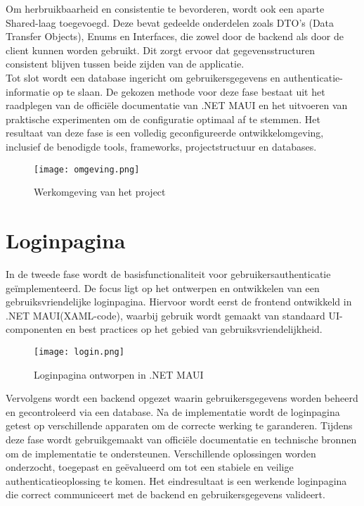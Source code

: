 Om herbruikbaarheid en consistentie te bevorderen, wordt ook een aparte Shared-laag toegevoegd. Deze bevat gedeelde onderdelen zoals DTO's (Data Transfer Objects), Enums en Interfaces, die zowel door de backend als door de client kunnen worden gebruikt. Dit zorgt ervoor dat gegevensstructuren consistent blijven tussen beide zijden van de applicatie. \\

Tot slot wordt een database ingericht om gebruikersgegevens en authenticatie-informatie op te slaan. De gekozen methode voor deze fase bestaat uit het raadplegen van de officiële documentatie van .NET MAUI en het uitvoeren van praktische experimenten om de configuratie optimaal af te stemmen. Het resultaat van deze fase is een volledig geconfigureerde ontwikkelomgeving, inclusief de benodigde tools, frameworks, projectstructuur en databases.\\

\begin{figure}[H]
	\centering
	\texttt{[image: omgeving.png]}
	\caption{Werkomgeving van het project}
	\label{fig:omgeving}
\end{figure}

\section{Loginpagina}

In de tweede fase wordt de basisfunctionaliteit voor gebruikersauthenticatie geïmplementeerd. De focus ligt op het ontwerpen en ontwikkelen van een gebruiksvriendelijke loginpagina. Hiervoor wordt eerst de frontend ontwikkeld in .NET MAUI(XAML-code), waarbij gebruik wordt gemaakt van standaard UI-componenten en best practices op het gebied van gebruiksvriendelijkheid. \\

\begin{figure}[H]
	\centering
	\texttt{[image: login.png]}
	\caption{Loginpagina ontworpen in .NET MAUI}
	\label{fig:loginpagina}
\end{figure}

Vervolgens wordt een backend opgezet waarin gebruikersgegevens worden beheerd en gecontroleerd via een database. Na de implementatie wordt de loginpagina getest op verschillende apparaten om de correcte werking te garanderen. Tijdens deze fase wordt gebruikgemaakt van officiële documentatie en technische bronnen om de implementatie te ondersteunen. Verschillende oplossingen worden onderzocht, toegepast en geëvalueerd om tot een stabiele en veilige authenticatieoplossing te komen. Het eindresultaat is een werkende loginpagina die correct communiceert met de backend en gebruikersgegevens valideert.

